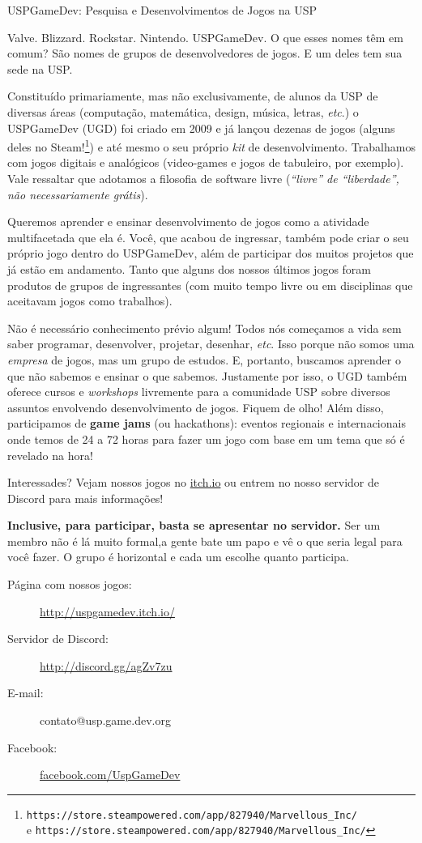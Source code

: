 \begin{subsecao}{USPGameDev: Pesquisa e Desenvolvimentos de Jogos na USP}


Valve. Blizzard. Rockstar. Nintendo. USPGameDev. O que esses nomes têm em comum?
São nomes de grupos de desenvolvedores de jogos. E um deles tem sua sede na USP.

Constituído primariamente, mas não exclusivamente, de alunos da USP de diversas
áreas (computação, matemática, design, música, letras, \textit{etc}.) o
USPGameDev (UGD) foi criado em 2009  e já lançou dezenas de jogos (alguns deles no 
Steam!\footnote{\texttt{https://store.steampowered.com/app/827940/Marvellous\_Inc/} \\ e \texttt{https://store.steampowered.com/app/827940/Marvellous\_Inc/}}) 
e até mesmo o seu próprio \textit{kit} de desenvolvimento. Trabalhamos com jogos 
digitais e analógicos (video-games e jogos de tabuleiro, por exemplo). Vale 
ressaltar que adotamos a filosofia de software livre (\textit{``livre'' de 
``liberdade'', não necessariamente grátis}).

Queremos aprender e ensinar desenvolvimento de jogos como a atividade 
multifacetada que ela é. Você, que acabou de ingressar, também pode criar o seu 
próprio jogo dentro do USPGameDev, além de participar dos muitos projetos que já 
estão em andamento. Tanto que alguns dos nossos últimos jogos foram produtos de 
grupos de ingressantes (com muito tempo livre ou em disciplinas que aceitavam 
jogos como trabalhos). 

Não é necessário conhecimento prévio algum! Todos nós começamos a vida sem saber 
programar, desenvolver, projetar, desenhar, \textit{etc}. Isso porque não somos 
uma \textit{empresa} de jogos, mas um grupo de estudos. E, portanto, buscamos 
aprender o que não sabemos e ensinar o que sabemos.
Justamente por isso, o UGD também oferece cursos e \textit{workshops} livremente 
para a comunidade USP sobre diversos assuntos envolvendo desenvolvimento de 
jogos. Fiquem de olho! Além disso, participamos de \textbf{game jams} (ou 
hackathons): eventos regionais e internacionais onde temos de 24 a 72 horas para 
fazer um jogo com base em um tema que só é revelado na hora!

Interessades? Vejam nossos jogos no \url{itch.io} ou entrem no nosso servidor de Discord para mais informações!

\textbf{Inclusive, para participar, basta se apresentar no servidor.} 
Ser um membro não é lá muito formal,a gente bate um papo e vê 
o que seria legal para você fazer. O grupo é horizontal e cada 
um escolhe quanto participa.

\begin{description}
  \item[Página com nossos jogos:] \url{http://uspgamedev.itch.io/}
  \item[Servidor de Discord:] \url{http://discord.gg/agZv7zu}
  \item[E-mail:] contato@usp.game.dev.org
  \item[Facebook:] \url{facebook.com/UspGameDev}
\end{description}

\end{subsecao}
